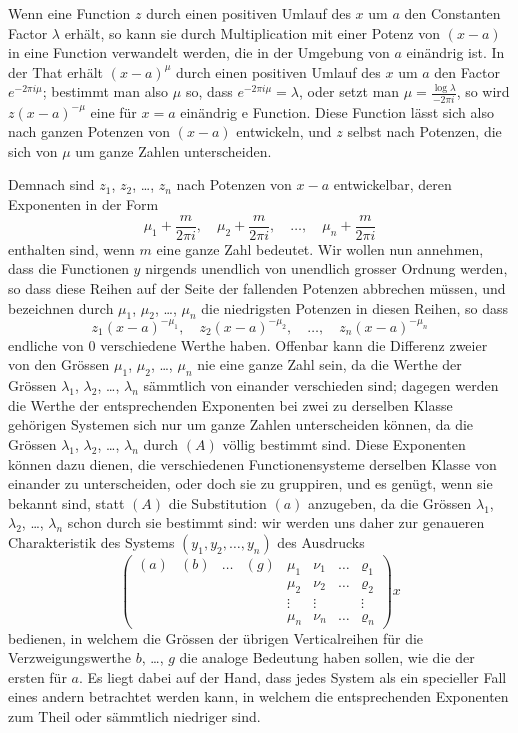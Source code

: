 \documentclass[12pt,a4paper]{article}
\begin{document}
Wenn eine Function $z$ durch einen positiven Umlauf des $x$ um $a$ den Constanten Factor $\lambda$ erh\"alt, so kann sie durch Multiplication mit einer Potenz von $(x-a)$ in eine Function verwandelt werden, die in der Umgebung von $a$ ein\"andrig ist. In der That erh\"alt $(x-a)^\mu$ durch einen positiven Umlauf des $x$ um $a$ den Factor $e^{-2\pi i\mu}$; bestimmt man also $\mu$ so, dass $e^{-2\pi i\mu} = \lambda$, oder setzt man $\mu = \frac{\log\lambda}{-2\pi i}$, so wird $z(x-a)^{-\mu}$ eine f\"ur $x=a$ ein\"andrig e Function. Diese Function l\"asst sich also nach ganzen Potenzen von $(x-a)$ entwickeln, und $z$ selbst nach Potenzen, die sich von $\mu$ um ganze Zahlen unterscheiden.

Demnach sind $z_1$, $z_2$, \ldots, $z_n$ nach Potenzen von $x-a$ entwickelbar, deren Exponenten in der Form
\[
\mu_1 + \frac{m}{2\pi i}, \quad \mu_2 + \frac{m}{2\pi i}, \quad \ldots, \quad \mu_n + \frac{m}{2\pi i}
\]
enthalten sind, wenn $m$ eine ganze Zahl bedeutet. Wir wollen nun annehmen, dass die Functionen $y$ nirgends unendlich von unendlich grosser Ordnung werden, so dass diese Reihen auf der Seite der fallenden Potenzen abbrechen m\"ussen, und bezeichnen durch $\mu_1$, $\mu_2$, \ldots, $\mu_n$ die niedrigsten Potenzen in diesen Reihen, so dass
\[
z_1(x-a)^{-\mu_1}, \quad z_2(x-a)^{-\mu_2}, \quad \ldots, \quad z_n(x-a)^{-\mu_n}
\]
endliche von $0$ verschiedene Werthe haben. Offenbar kann die Differenz zweier von den Gr\"ossen $\mu_1$, $\mu_2$, \ldots, $\mu_n$ nie eine ganze Zahl sein, da die Werthe der Gr\"ossen $\lambda_1$, $\lambda_2$, \ldots, $\lambda_n$ s\"ammtlich von einander verschieden sind; dagegen werden die Werthe der entsprechenden Exponenten bei zwei zu derselben Klasse geh\"origen Systemen sich nur um ganze Zahlen unterscheiden k\"onnen, da die Gr\"ossen $\lambda_1$, $\lambda_2$, \ldots, $\lambda_n$ durch $(A)$ v\"ollig bestimmt sind. Diese Exponenten k\"onnen dazu dienen, die verschiedenen Functionensysteme derselben Klasse von einander zu unterscheiden, oder doch sie zu gruppiren, und es gen\"ugt, wenn sie bekannt sind, statt $(A)$ die Substitution $(a)$ anzugeben, da die Gr\"ossen $\lambda_1$, $\lambda_2$, \ldots, $\lambda_n$ schon durch sie bestimmt sind: wir werden uns daher zur genaueren Charakteristik des Systems $(y_1, y_2, \ldots, y_n)$ des Ausdrucks
\[
\left(\begin{array}{cccc|cccc}
(a) & (b) & \ldots & (g) & \mu_1 & \nu_1 & \ldots & \varrho_1 \\
&&&& \mu_2 & \nu_2 & \ldots & \varrho_2 \\
&&&& \vdots & \vdots & & \vdots \\
&&&& \mu_n & \nu_n & \ldots & \varrho_n
\end{array}\right)x
\]
bedienen, in welchem die Gr\"ossen der \"ubrigen Verticalreihen f\"ur die Verzweigungswerthe $b$, \ldots, $g$ die analoge Bedeutung haben sollen, wie die der ersten f\"ur $a$. Es liegt dabei auf der Hand, dass jedes System als ein specieller Fall eines andern betrachtet werden kann, in welchem die entsprechenden Exponenten zum Theil oder s\"ammtlich niedriger sind.
\end{document}
